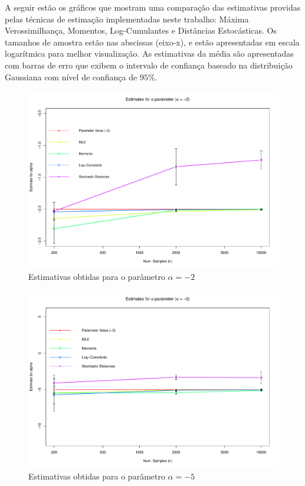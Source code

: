 \documentclass[12pt]{article}
\begin{document}
A seguir estão os gráficos que mostram uma comparação das estimativas providas pelas técnicas de estimação implementadas neste trabalho: Máxima Verossimilhança, Momentos, Log-Cumulantes e Distâncias Estocásticas. Os tamanhos de amostra estão nas abscissas (eixo-x), e estão apresentadas em escala logarítmica para melhor visualização. As estimativas da média são apresentadas com barras de erro que exibem o intervalo de confiança baseado na distribuição Gaussiana com nível de confiança de $95\%$.
\begin{figure}[H]
     \centering
     \includegraphics[scale=0.5]{plots/ComparisonAlpha-2.pdf}
     \caption{Estimativas obtidas para o parâmetro $\alpha = -2$}
     \label{graf_1}
\end{figure}
\begin{figure}[H]
     \centering
     \includegraphics[scale=0.5]{plots/ComparisonAlpha-5.pdf}
     \caption{Estimativas obtidas para o parâmetro $\alpha = -5$}
     \label{graf_2}
\end{figure}
\end{document}
